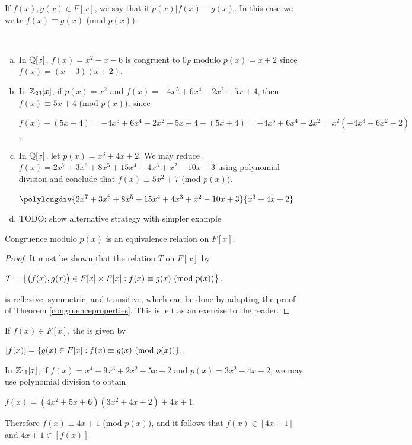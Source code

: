\documentclass[11pt,fleqn,dvipsnames,usenames]{article}
\begin{document}
\begin{definition}
If $f(x),g(x)\in F[x]$, we say that  if $p(x)|f(x) - g(x)$.  In this case we write $f(x)\equiv g(x)$ (mod $p(x)$).
\end{definition}
%
\begin{examples}~
\begin{enumerate}[(a)]
\item In $\mathbb{Q}[x]$, $f(x) = x^2 - x - 6$ is congruent to $0_{F}$ modulo $p(x) = x+2$ since $f(x) = (x-3)(x+2)$.
\item In $\mathbb{Z}_{23}[x]$, if $p(x) = x^2$ and $f(x) = -4x^5 + 6x^4 - 2x^2 + 5x + 4$, then $f(x) \equiv 5x + 4$ (mod $p(x)$), since
\begin{center}
$f(x) - (5x + 4) = -4x^5 + 6x^4 - 2x^2 + 5x + 4 - (5x + 4) = -4x^5 + 6x^4 - 2x^2 = x^2(-4x^3 + 6x^2 - 2)$.
\end{center}
\item In $\mathbb{Q}[x]$, let $p(x) = x^3 + 4x + 2$.  We may reduce $f(x) = 2x^7 + 3x^6 + 8x^5 + 15x^4 + 4x^3 + x^2 - 10x + 3$ using polynomial division and conclude that $f(x) \equiv 5x^2 + 7$ (mod $p(x)$).
\begin{center}
$\polylongdiv{2x^7 + 3x^6 + 8x^5 + 15x^4 + 4x^3 + x^2 - 10x + 3}{x^3 + 4x + 2}$
\end{center}
\item {\color{blue} TODO: show alternative strategy with simpler example}
\end{enumerate}
\end{examples}
%

\begin{theorem}
Congruence modulo $p(x)$ is an equivalence relation on $F[x]$.
\end{theorem}
%
\begin{proof}
It must be shown that the relation $T$ on $F[x]$ by
\begin{center}
$T = \left\{\big(f(x),g(x)\big)\in F[x]\times F[x]:f(x)\equiv g(x)\text{ (mod }p(x)\text{)}\right\}$.
\end{center}
is reflexive, symmetric, and transitive, which can be done by adapting the proof of Theorem \ref{congruenceproperties}.  This is left as an exercise to the reader.
\end{proof}
\vsmsp

\begin{definition}
If $f(x)\in F[x]$, the  is given by
\begin{center}
$[f(x)] = \left\{g(x)\in F[x]:f(x)\equiv g(x)\text{ (mod }p(x)\text{)}\right\}$.
\end{center}
\end{definition}
%
\begin{example}
In $\mathbb{Z}_{11}[x]$, if $f(x) = x^4 + 9x^3 + 2x^2 + 5x + 2$ and $p(x) = 3x^2 + 4x + 2$, we may use polynomial division to obtain
\begin{center}
$f(x) = (4x^2 + 5x + 6)(3x^2 + 4x + 2) + 4x +1$.
\end{center}
Therefore $f(x) \equiv 4x +1$ (mod $p(x)$), and it follows that $f(x)\in [4x + 1]$ and $4x+1\in [f(x)]$.
\end{example}
\vsmsp
\end{document}
